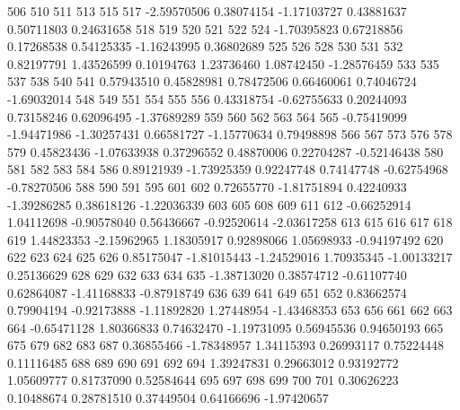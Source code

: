 \documentclass{article}
\begin{document}
\begin{Schunk}
\begin{Soutput}
        506         510         511         513         515         517 
-2.59570506  0.38074154 -1.17103727  0.43881637  0.50711803  0.24631658 
        518         519         520         521         522         524 
-1.70395823  0.67218856  0.17268538  0.54125335 -1.16243995  0.36802689 
        525         526         528         530         531         532 
 0.82197791  1.43526599  0.10194763  1.23736460  1.08742450 -1.28576459 
        533         535         537         538         540         541 
 0.57943510  0.45828981  0.78472506  0.66460061  0.74046724 -1.69032014 
        548         549         551         554         555         556 
 0.43318754 -0.62755633  0.20244093  0.73158246  0.62096495 -1.37689289 
        559         560         562         563         564         565 
-0.75419099 -1.94471986 -1.30257431  0.66581727 -1.15770634  0.79498898 
        566         567         573         576         578         579 
 0.45823436 -1.07633938  0.37296552  0.48870006  0.22704287 -0.52146438 
        580         581         582         583         584         586 
 0.89121939 -1.73925359  0.92247748  0.74147748 -0.62754968 -0.78270506 
        588         590         591         595         601         602 
 0.72655770 -1.81751894  0.42240933 -1.39286285  0.38618126 -1.22036339 
        603         605         608         609         611         612 
-0.66252914  1.04112698 -0.90578040  0.56436667 -0.92520614 -2.03617258 
        613         615         616         617         618         619 
 1.44823353 -2.15962965  1.18305917  0.92898066  1.05698933 -0.94197492 
        620         622         623         624         625         626 
 0.85175047 -1.81015443 -1.24529016  1.70935345 -1.00133217  0.25136629 
        628         629         632         633         634         635 
-1.38713020  0.38574712 -0.61107740  0.62864087 -1.41168833 -0.87918749 
        636         639         641         649         651         652 
 0.83662574  0.79904194 -0.92173888 -1.11892820  1.27448954 -1.43468353 
        653         656         661         662         663         664 
-0.65471128  1.80366833  0.74632470 -1.19731095  0.56945536  0.94650193 
        665         675         679         682         683         687 
 0.36855466 -1.78348957  1.34115393  0.26993117  0.75224448  0.11116485 
        688         689         690         691         692         694 
 1.39247831  0.29663012  0.93192772  1.05609777  0.81737090  0.52584644 
        695         697         698         699         700         701 
 0.30626223  0.10488674  0.28781510  0.37449504  0.64166696 -1.97420657 

\end{Soutput}
\end{Schunk}
\end{document}

